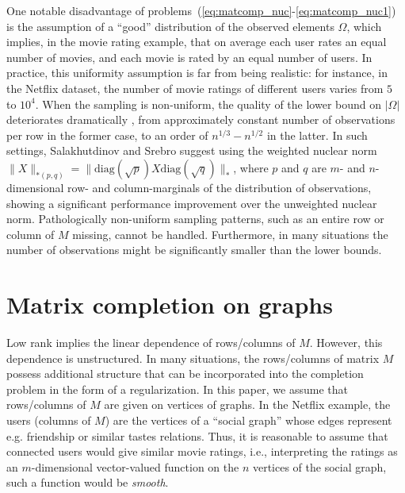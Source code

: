 \documentclass{article}
\begin{document}
One notable disadvantage of problems~(\ref{eq:matcomp_nuc}-\ref{eq:matcomp_nuc1}) is the assumption of a ``good'' distribution of the observed elements $\Omega$, which implies, in the movie rating example, that on average each user rates an equal number of movies, and each movie is rated by an equal number of users. In practice, this uniformity assumption is far from being realistic: for instance, in the Netflix dataset, the number of movie ratings of different users varies from $5$ to $10^4$. When the sampling is non-uniform, the quality of the lower bound on $|\Omega|$ deteriorates dramatically \cite{salakhutdinov2010collaborative}, from approximately constant number of observations per row in the former case, to an order of $n^{1/3} - n^{1/2}$ in the latter. In such settings, Salakhutdinov and Srebro \cite{salakhutdinov2010collaborative} suggest using the weighted nuclear norm $\| X \|_{*(p,q)} = \| \mathrm{diag}(\sqrt{p}) X \mathrm{diag}(\sqrt{q}) \|_*$, where $p$ and $q$ are $m$- and $n$- dimensional row- and column-marginals of the distribution of observations, showing a significant performance improvement over the unweighted nuclear norm. Pathologically non-uniform sampling patterns, such as an entire row or column of $M$ missing, cannot be handled. Furthermore, in many situations the number of observations might be significantly smaller than the lower bounds. 



















\vspace{-0.1cm}
\section{Matrix completion on graphs}
\label{secMatComOnGrap}
\vspace{-0.2cm}


Low rank implies the linear dependence of rows/columns of $M$. However, this dependence is unstructured. In many situations, the rows/columns of matrix $M$ possess additional structure that can be incorporated into the completion problem in the form of a regularization. In this paper, we assume that rows/columns of $M$ are given on vertices of graphs. In the Netflix example, the users (columns of $M$) are the vertices of a ``social graph'' whose edges represent e.g. friendship or similar tastes  relations. Thus, it is reasonable to assume that connected users would give similar movie ratings, i.e., interpreting the ratings as an $m$-dimensional vector-valued function on the $n$ vertices of the social graph, such a function would be {\em smooth}.
\end{document}
